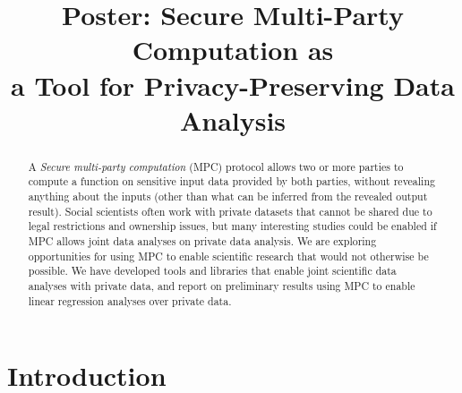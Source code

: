 \documentclass[conference]{IEEEtran}
\begin{document}
\title{Poster: Secure Multi-Party Computation as\\ a Tool for Privacy-Preserving Data Analysis}

\author{

}
\maketitle


\begin{abstract}

A \emph{Secure multi-party computation} (MPC) protocol allows two or
more parties to compute a function on sensitive input data provided by
both parties, without revealing anything about the inputs (other than
what can be inferred from the revealed output result).  Social
scientists often work with private datasets that cannot be shared due to
legal restrictions and ownership issues, but many interesting studies
could be enabled if MPC allows joint data analyses on private data
analysis. We are exploring opportunities for using MPC to enable
scientific research that would not otherwise be possible.  We have
developed tools and libraries that enable joint scientific data analyses
with private data, and report on preliminary results using MPC to enable
linear regression analyses over private data.

\end{abstract}

\section{Introduction}
\end{document}
